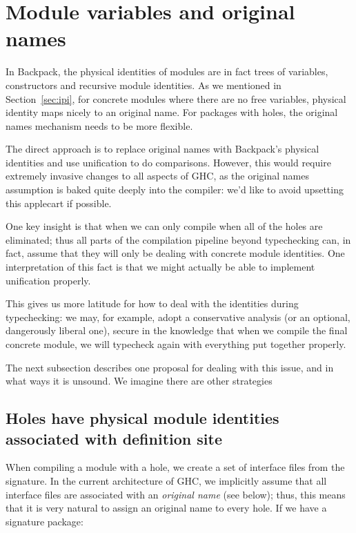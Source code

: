 \documentclass{article}
\begin{document}
\section{Module variables and original names}\label{sec:variables}

In Backpack, the physical identities of modules are in fact trees of
variables, constructors and recursive module identities.  As we
mentioned in Section~\ref{sec:ipi}, for concrete modules where there are
no free variables, physical identity maps nicely to an original name.
For packages with holes, the original names mechanism needs to be more
flexible.

The direct approach is to replace original names with Backpack's
physical identities and use unification to do comparisons.  However,
this would require extremely invasive changes to all aspects of GHC, as
the original names assumption is baked quite deeply into the compiler:
we'd like to avoid upsetting this applecart if possible.

One key insight is that when we can only compile when all of the holes
are eliminated; thus all parts of the compilation pipeline beyond
typechecking can, in fact, assume that they will only be dealing with
concrete module identities.  One interpretation of this fact is that
we might actually be able to implement unification properly.

This gives us more latitude for how to
deal with the identities during typechecking: we may, for example,
adopt a conservative analysis (or an optional, dangerously liberal one),
secure in the knowledge that when we compile the final concrete module,
we will typecheck again with everything put together properly.

The next subsection describes one proposal for dealing with this issue,
and in what ways it is unsound.  We imagine there are other strategies

\subsection{Holes have physical module identities associated with definition site}

When compiling a module with a hole, we create a set of interface files
from the signature.  In the current architecture of GHC, we implicitly
assume that all interface files are associated with an \emph{original
name} (see below); thus, this means that it is very natural to assign an
original name to every hole.  If we have a signature package:
\end{document}
